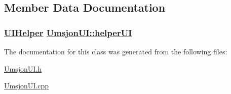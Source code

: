 \subsection{Member Data Documentation}
\hypertarget{class_umsjon_u_i_165ca02db075e280199e0970e3465900}{
\subsubsection[helperUI]{\setlength{\rightskip}{0pt plus 5cm}\hyperlink{class_u_i_helper}{UIHelper} \hyperlink{class_umsjon_u_i_165ca02db075e280199e0970e3465900}{Umsjon\-UI::helper\-UI}}}
\label{class_umsjon_u_i_165ca02db075e280199e0970e3465900}




The documentation for this class was generated from the following files:\begin{CompactItemize}
\item 
\hyperlink{_umsjon_u_i_8h}{Umsjon\-UI.h}\item 
\hyperlink{_umsjon_u_i_8cpp}{Umsjon\-UI.cpp}\end{CompactItemize}
